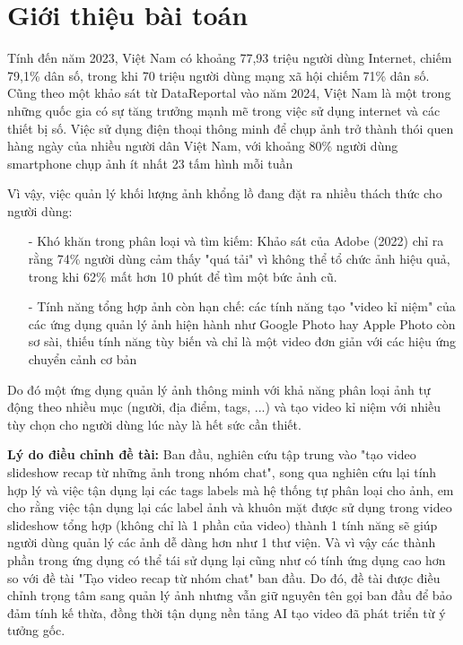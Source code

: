 \section{Giới thiệu bài toán}

Tính đến năm 2023, Việt Nam có khoảng 77,93 triệu người dùng Internet, chiếm 79,1\% dân số, trong khi 70 triệu người dùng mạng xã hội chiếm 71\% dân số\cite{vnetwork2023}. Cũng theo một khảo sát từ DataReportal vào năm 2024, Việt Nam là một trong những quốc gia có sự tăng trưởng mạnh mẽ trong việc sử dụng internet và các thiết bị số\cite{datareportal}. Việc sử dụng điện thoại thông minh để chụp ảnh trở thành thói quen hàng ngày của nhiều người dân Việt Nam, với khoảng 80\% người dùng smartphone chụp ảnh ít nhất 23 tấm hình mỗi tuần \cite{qandme}

Vì vậy, việc quản lý khối lượng ảnh khổng lồ đang đặt ra nhiều thách thức cho người dùng:
\begin{itemize}
	\item[-] Khó khăn trong phân loại và tìm kiếm: Khảo sát của Adobe (2022)\cite{catchlight} chỉ ra rằng 74\% người dùng cảm thấy "quá tải" vì không thể tổ chức ảnh hiệu quả, trong khi 62\% mất hơn 10 phút để tìm một bức ảnh cũ.
	\item[-] Tính năng tổng hợp ảnh còn hạn chế: các tính năng tạo "video kỉ niệm" của các ứng dụng quản lý ảnh hiện hành như Google Photo hay Apple Photo còn sơ sài, thiếu tính năng tùy biến và chỉ là một video đơn giản với các hiệu ứng chuyển cảnh cơ bản\cite{usmobile}
\end{itemize}

Do đó một ứng dụng quản lý ảnh thông minh với khả năng phân loại ảnh tự động theo nhiều mục (người, địa điểm, tags, ...) và tạo video kỉ niệm với nhiều tùy chọn cho người dùng lúc này là hết sức cần thiết.

\textbf{Lý do điều chỉnh đề tài:} Ban đầu, nghiên cứu tập trung vào "tạo video slideshow recap từ những ảnh trong nhóm chat", song qua nghiên cứu lại tính hợp lý và việc tận dụng lại các tags labels mà hệ thống tự phân loại cho ảnh, em cho rằng việc tận dụng lại các label ảnh và khuôn mặt được sử dụng trong video slideshow tổng hợp (không chỉ là 1 phần của video) thành 1 tính năng sẽ giúp người dùng quản lý các ảnh dễ dàng hơn như 1 thư viện. Và vì vậy các thành phần trong ứng dụng có thể tái sử dụng lại cũng như có tính ứng dụng cao hơn so với đề tài "Tạo video recap từ nhóm chat" ban đầu. Do đó, đề tài được điều chỉnh trọng tâm sang quản lý ảnh nhưng vẫn giữ nguyên tên gọi ban đầu để bảo đảm tính kế thừa, đồng thời tận dụng nền tảng AI tạo video đã phát triển từ ý tưởng gốc.

